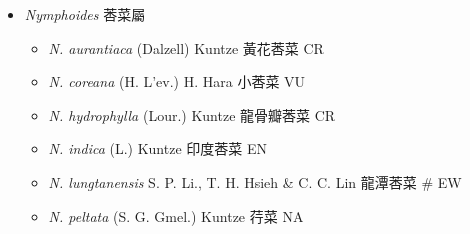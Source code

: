 
  \begin{itemize}
 \item[] \textit{Nymphoides} 莕菜屬
                                
  \begin{itemize}
        \item[] \textit{N. aurantiaca} (Dalzell) Kuntze  黃花莕菜   CR
        \item[] \textit{N. coreana} (H. L'ev.) H. Hara  小莕菜   VU
        \item[] \textit{N. hydrophylla} (Lour.) Kuntze  龍骨瓣莕菜   CR
        \item[] \textit{N. indica} (L.) Kuntze  印度莕菜   EN
        \item[] \textit{N. lungtanensis} S. P. Li., T. H. Hsieh \& C. C. Lin  龍潭莕菜  \# EW
        \item[] \textit{N. peltata} (S. G. Gmel.) Kuntze  荇菜   NA
  \end{itemize}
  \end{itemize}
